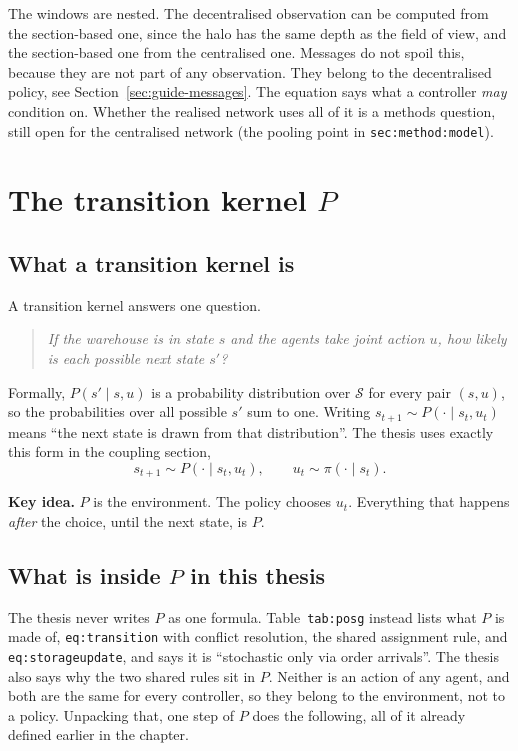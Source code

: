 \documentclass[11pt,a4paper]{article}
\newcommand{\idea}[1]{\par\smallskip\noindent\colorbox{boxbg}{\parbox{\dimexpr\linewidth-2\fboxsep}{\textbf{Key idea.} #1}}\par\smallskip}
\begin{document}
\noindent The windows are nested. The decentralised observation can be
computed from the section-based one, since the halo has the same depth as
the field of view, and the section-based one from the centralised one.
Messages do not spoil this, because they are not part of any observation.
They belong to the decentralised policy, see
Section~\ref{sec:guide-messages}.
The equation says what a controller \emph{may} condition on. Whether the
realised network uses all of it is a methods question, still open for the
centralised network (the pooling point in \texttt{sec:method:model}).

\section{The transition kernel \texorpdfstring{$P$}{P}}
\label{sec:guide-kernel}

\subsection{What a transition kernel is}

A transition kernel answers one question.
\begin{quote}
  \emph{If the warehouse is in state $s$ and the agents take joint action
  $u$, how likely is each possible next state $s'$?}
\end{quote}
Formally, $P(s' \mid s, u)$ is a probability distribution over
$\mathcal{S}$ for every pair $(s,u)$, so the probabilities over all
possible $s'$ sum to one. Writing $s_{t+1} \sim P(\cdot \mid s_t, u_t)$
means ``the next state is drawn from that distribution''. The thesis
uses exactly this form in the coupling section,
\[
  s_{t+1} \sim P(\cdot \mid s_t, u_t), \qquad u_t \sim \pi(\cdot \mid s_t).
\]

\idea{$P$ is the environment. The policy chooses $u_t$. Everything that
happens \emph{after} the choice, until the next state, is $P$.}

\subsection{What is inside \texorpdfstring{$P$}{P} in this thesis}

The thesis never writes $P$ as one formula. Table~\texttt{tab:posg}
instead lists what $P$ is made of, \texttt{eq:transition} with conflict
resolution, the shared assignment rule, and \texttt{eq:storageupdate}, and
says it is ``stochastic only via order arrivals''. The thesis also says why
the two shared rules sit in $P$. Neither is an action of any agent, and
both are the same for every controller, so they belong to the environment,
not to a policy. Unpacking that, one step of $P$ does the following, all of
it already defined earlier in the chapter.
\end{document}
